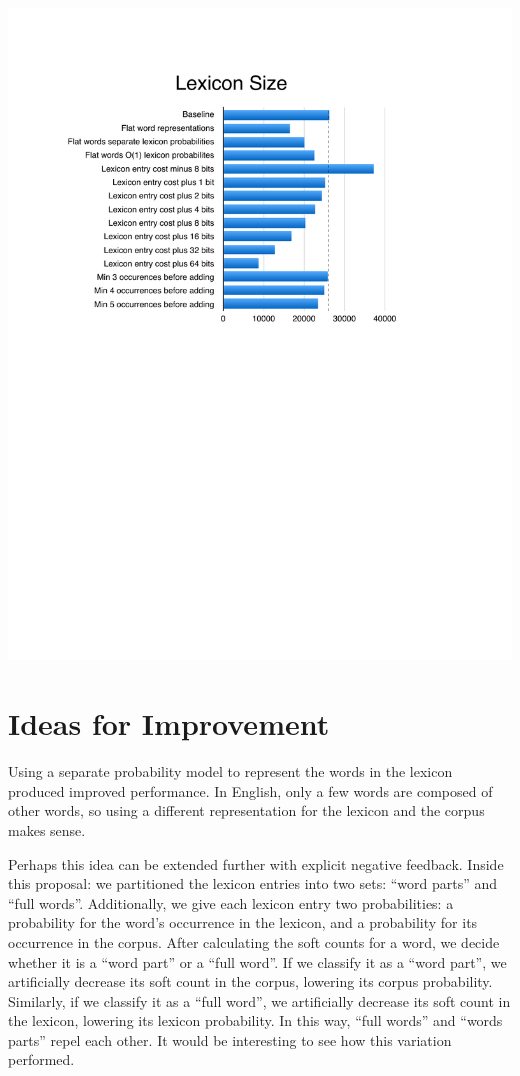 \documentclass[11pt, oneside, fleqn]{article}
\begin{document}
  \includegraphics{./figure/lexicon_size.pdf}

  \section{Ideas for Improvement}

  Using a separate probability model to represent the words in the lexicon produced improved performance. In English, only a few words are composed of other words, so using a different representation for the lexicon and the corpus makes sense.
  
  Perhaps this idea can be extended further with explicit negative feedback. Inside this proposal: we partitioned the lexicon entries into two sets: ``word parts'' and ``full words''. Additionally, we give each lexicon entry two probabilities: a probability for the word's occurrence in the lexicon, and a probability for its occurrence in the corpus.  After calculating the soft counts for a word, we decide whether it is a ``word part'' or a ``full word''. If we classify it as a ``word part'', we artificially decrease its soft count in the corpus, lowering its corpus probability. Similarly, if we classify it as a ``full word'', we artificially decrease its soft count in the lexicon, lowering its lexicon probability. In this way, ``full words'' and ``words parts'' repel each other. It would be interesting to see how this variation performed.
\end{document}
